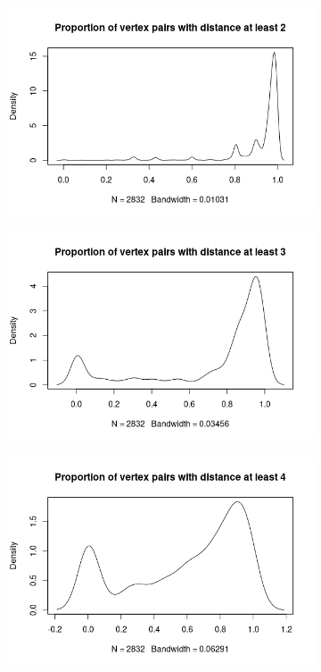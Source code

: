 \documentclass{article}
\theoremstyle{definition}
\theoremstyle{remark}
\begin{document}
\begin{figure}
  \begin{subfigure}[t]{0.49\textwidth}
    \centering
    \includegraphics[width=\textwidth]{sip_prop2.png}
  \end{subfigure}
  \begin{subfigure}[t]{0.49\textwidth}
    \centering
    \includegraphics[width=\textwidth]{sip_prop3.png}
  \end{subfigure}
  \begin{subfigure}[t]{0.49\textwidth}
    \centering
    \includegraphics[width=\textwidth]{sip_prop4.png}

\end{subfigure}
\end{figure}
\end{document}
